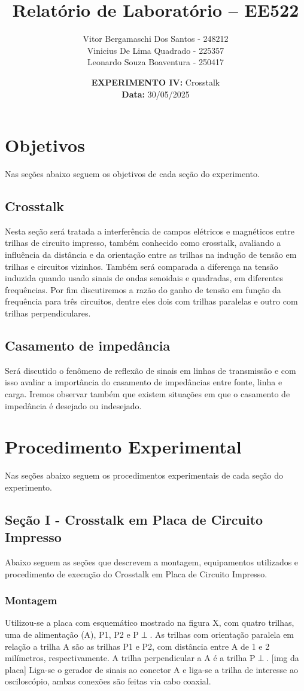 \documentclass[12pt]{article}
\author{
  Vitor Bergamaschi Dos Santos - 248212\\
  Vinicius De Lima Quadrado - 225357\\
  Leonardo Souza Boaventura - 250417
}
\title{\textbf{Relatório de Laboratório -- EE522}}
\date{\textbf{EXPERIMENTO IV:} Crosstalk
\\ \textbf{Data:} 30/05/2025}
\begin{document}
\maketitle

\section{Objetivos}
Nas seções abaixo seguem os objetivos de cada seção do experimento.

\subsection{Crosstalk}
Nesta seção será tratada a interferência de campos elétricos e
magnéticos entre trilhas de circuito impresso, também conhecido como
crosstalk, avaliando a influência da distância e da orientação entre
as trilhas na indução de tensão em trilhas e circuitos vizinhos.
Também será comparada a diferença na tensão induzida quando usado
sinais de ondas senoidais e quadradas, em diferentes frequências.
Por fim discutiremos a razão do ganho de tensão em função da
frequência para três circuitos, dentre eles dois com trilhas
paralelas e outro com trilhas perpendiculares.

\subsection{Casamento de impedância}
Será discutido o fenômeno de reflexão de sinais em linhas de
transmissão e com isso avaliar a importância do casamento de
impedâncias entre fonte, linha e carga. Iremos observar também que
existem situações em que o casamento de impedância é desejado ou indesejado.

\section{Procedimento Experimental}
Nas seções abaixo seguem os procedimentos experimentais de cada seção
do experimento.

\subsection{Seção I - Crosstalk em Placa de Circuito Impresso}

Abaixo seguem as seções que descrevem a montagem, equipamentos
utilizados e procedimento de execução do Crosstalk em Placa de
Circuito Impresso.

\subsubsection{Montagem}
Utilizou-se a placa com esquemático mostrado na figura X, com quatro
trilhas, uma de alimentação (A), P1, P2 e P$\perp$.
As trilhas com orientação paralela em relação a trilha A são as
trilhas P1 e P2, com distância entre A de 1 e 2 milímetros,
respectivamente. A trilha perpendicular a A é a trilha P$\perp$.
[img da placa]
Liga-se o gerador de sinais ao conector A e liga-se a trilha de
interesse ao osciloscópio, ambas conexões são feitas via cabo coaxial.
\end{document}
